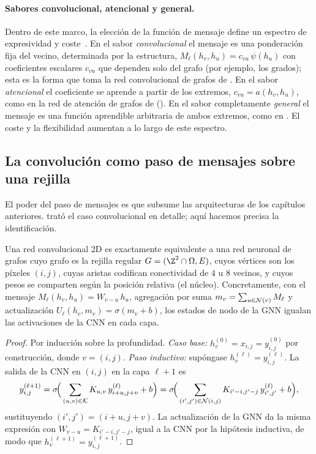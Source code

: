 \paragraph{Sabores convolucional, atencional y general.}
Dentro de este marco, la elecci\'on de la funci\'on de mensaje define un espectro
de expresividad y coste~\citep{bronstein2021geometric}. En el sabor
\emph{convolucional} el mensaje es una ponderaci\'on fija del vecino, determinada
por la estructura, $M_\ell(h_v, h_u) = c_{vu}\, \psi(h_u)$ con coeficientes
escalares $c_{vu}$ que dependen solo del grafo (por ejemplo, los grados); esta es
la forma que toma la red convolucional de grafos de \citet{kipf2017semi}. En el
sabor \emph{atencional} el coeficiente se aprende a partir de los extremos,
$c_{vu} = a(h_v, h_u)$, como en la red de atenci\'on de grafos de
\citet{velickovic2017graph} (). En el sabor completamente
\emph{general} el mensaje es una funci\'on aprendible arbitraria de ambos
extremos, como en . El coste y la flexibilidad aumentan a lo
largo de este espectro.

\subsection{La convoluci\'on como paso de mensajes sobre una rejilla}
\label{sec:graphs:cnn-mpnn}

El poder del paso de mensajes es que subsume las arquitecturas de los cap\'itulos
anteriores.  trat\'o el caso convolucional en detalle; aqu\'i
hacemos precisa la identificaci\'on.

\begin{theorem}
\label{thm:graphs:cnn-gnn}
Una red convolucional 2D es exactamente equivalente a una red neuronal de grafos
cuyo grafo es la rejilla regular $G = (\Z^2 \cap \Omega, E)$, cuyos v\'ertices son
los p\'ixeles $(i,j)$, cuyas aristas codifican conectividad de $4$ u $8$ vecinos,
y cuyos pesos se comparten seg\'un la posici\'on relativa (el n\'ucleo).
Concretamente, con el mensaje $M_\ell(h_v, h_u) = W_{v-u}\, h_u$, agregaci\'on por
suma $m_v = \sum_{u \in \mathcal{N}(v)} M_\ell$ y actualizaci\'on
$U_\ell(h_v, m_v) = \sigma(m_v + b)$, los estados de nodo de la GNN igualan las
activaciones de la CNN en cada capa.
\end{theorem}

\begin{proof}
Por inducci\'on sobre la profundidad. \emph{Caso base:}
$h_v^{(0)} = x_{i,j} = y_{i,j}^{(0)}$ por construcci\'on, donde $v = (i,j)$.
\emph{Paso inductivo:} sup\'ongase $h_v^{(\ell)} = y_{i,j}^{(\ell)}$. La salida de
la CNN en $(i,j)$ en la capa $\ell+1$ es
\[
  y_{i,j}^{(\ell+1)}
    = \sigma\!\Big(\sum_{(u,v)\in\mathcal{K}} K_{u,v}\, y_{i+u,j+v}^{(\ell)} + b\Big)
    = \sigma\!\Big(\sum_{(i',j')\in\mathcal{N}(i,j)} K_{i'-i,j'-j}\, y_{i',j'}^{(\ell)} + b\Big),
\]
sustituyendo $(i',j') = (i+u, j+v)$. La actualizaci\'on de la GNN da la misma
expresi\'on con $W_{v-u} = K_{i'-i,j'-j}$, igual a la CNN por la hip\'otesis
inductiva, de modo que $h_v^{(\ell+1)} = y_{i,j}^{(\ell+1)}$.
\end{proof}

